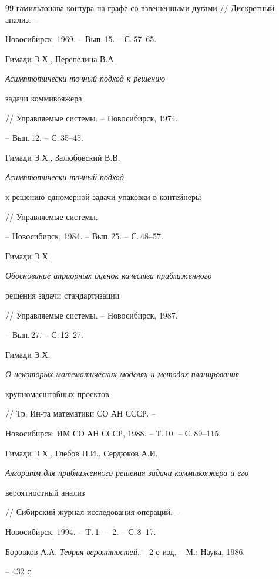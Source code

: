 \begin {thebibliography}{99}
{гамильтонова контура на графе со взвешенными дугами} // Дискретный анализ. --


Новосибирск, 1969. -- Вып.\,15. -- С.\,57--65.




Гимади Э.Х., Перепелица В.А. {\em Асимптотически точный подход к решению


задачи коммивояжера} // Управляемые системы. -- Новосибирск, 1974.


-- Вып.\,12. -- С.\,35--45.




Гимади Э.Х., Залюбовский В.В. {\em Асимптотически точный подход


к решению одномерной задачи упаковки в контейнеры} // Управляемые системы.


-- Новосибирск, 1984. -- Вып.\,25. -- С.\,48--57.




Гимади Э.Х. {\em Обоснование априорных оценок качества приближенного


решения задачи стандартизации} // Управляемые системы. -- Новосибирск, 1987.


-- Вып.\,27. -- С.\,12--27.




Гимади Э.Х. {\em О некоторых математических моделях и методах планирования


крупномасштабных проектов} // Тр. Ин-та математики СО АН СССР. --


Новосибирск: ИМ СО АН СССР, 1988. -- Т.\,10. -- С.\,89--115.




Гимади Э.Х., Глебов Н.И., Сердюков А.И.


{\em Алгоритм для приближенного решения задачи коммивояжера и его


вероятностный анализ} // Сибирский журнал исследования операций. --


Новосибирск, 1994. -- T.\,1. -- \No\,2. -- С.\,8--17.




Боровков А.А. {\em Теория вероятностей}. -- 2-е изд. -- М.: Наука, 1986.


-- 432 с.





\end{thebibliography} 


 


\vskip 2cm 


 








 


 





